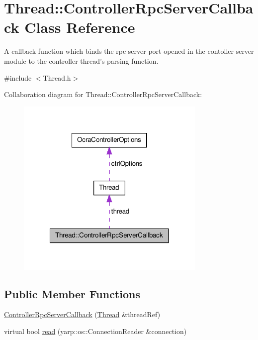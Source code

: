 \hypertarget{classThread_1_1ControllerRpcServerCallback}{\section{\-Thread\-:\-:\-Controller\-Rpc\-Server\-Callback \-Class \-Reference}
\label{classThread_1_1ControllerRpcServerCallback}
}


\-A callback function which binds the rpc server port opened in the contoller server module to the controller thread's parsing function.  




{\ttfamily \#include $<$\-Thread.\-h$>$}



\-Collaboration diagram for \-Thread\-:\-:\-Controller\-Rpc\-Server\-Callback\-:\nopagebreak
\begin{figure}[H]
\begin{center}
\leavevmode
\includegraphics[width=258pt]{classThread_1_1ControllerRpcServerCallback__coll__graph}
\end{center}
\end{figure}
\subsection*{\-Public \-Member \-Functions}
\begin{DoxyCompactItemize}
\item 
\hyperlink{classThread_1_1ControllerRpcServerCallback_ad836e4cdaafc42ad309b5248ef38c280}{\-Controller\-Rpc\-Server\-Callback} (\hyperlink{classThread}{\-Thread} \&thread\-Ref)
\item 
virtual bool \hyperlink{classThread_1_1ControllerRpcServerCallback_a61f5510543f1bb96793dceca13eb6865}{read} (yarp\-::os\-::\-Connection\-Reader \&connection)
\end{DoxyCompactItemize}
